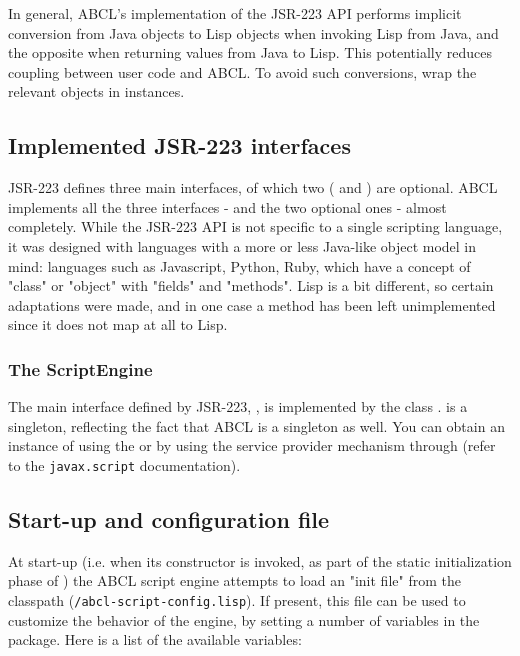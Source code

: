 \documentclass[10pt]{book}
\begin{document}
In general, ABCL's implementation of the JSR-223 API performs implicit
conversion from Java objects to Lisp objects when invoking Lisp from
Java, and the opposite when returning values from Java to Lisp. This
potentially reduces coupling between user code and ABCL. To avoid such
conversions, wrap the relevant objects in  instances.

\subsection{Implemented JSR-223 interfaces}

JSR-223 defines three main interfaces, of which two (
and ) are optional. ABCL implements all the three
interfaces -  and the two optional ones - almost
completely. While the JSR-223 API is not specific to a single scripting
language, it was designed with languages with a more or less Java-like
object model in mind: languages such as Javascript, Python, Ruby, which
have a concept of "class" or "object" with "fields" and "methods". Lisp
is a bit different, so certain adaptations were made, and in one case a
method has been left unimplemented since it does not map at all to Lisp.

\subsubsection{The ScriptEngine}

The main interface defined by JSR-223, ,
is implemented by the class
. 
is a singleton, reflecting the fact that ABCL is a singleton as
well. You can obtain an instance of  using the
 or by using the service provider
mechanism through  (refer to the
\texttt{javax.script} documentation).

\subsection{Start-up and configuration file}

At start-up (i.e. when its constructor is invoked, as part of the
static initialization phase of ) the ABCL
script engine attempts to load an "init file" from the classpath
(\texttt{/abcl-script-config.lisp}). If present, this file can be used to
customize the behavior of the engine, by setting a number of
variables in the  package. Here is a list of the available
variables:
\end{document}
